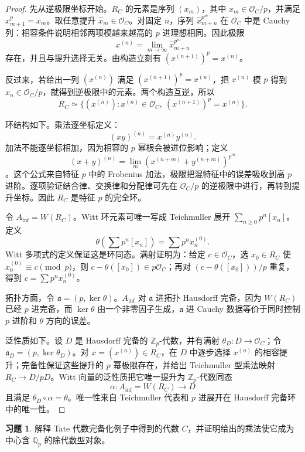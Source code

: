 \documentclass[11pt,a4paper,openany]{ctexbook}
\numberwithin{equation}{chapter}
\newcommand{\Q}{\mathbb{Q}}
\newcommand{\Z}{\mathbb{Z}}
\theoremstyle{plain}
\theoremstyle{definition}
\newtheorem{exercise}[theorem]{习题}
\theoremstyle{remark}
\begin{document}
\begin{proof}
先从逆极限坐标开始。$R_C$ 的元素是序列 $(x_m)$，其中 $x_m\in\mathcal O_C/p$，并满足 $x_{m+1}^p=x_m$。取任意提升 $\widehat x_m\in\mathcal O_C$。对固定 $n$，序列 $\widehat x_{m+n}^{p^m}$ 在 $\mathcal O_C$ 中是 Cauchy 列：相容条件说明相邻两项模越来越高的 $p$ 进理想相同。因此极限
\[
  x^{(n)}=\lim_{m\to\infty}\widehat x_{m+n}^{p^m}
\]
存在，并且与提升选择无关。由构造立刻有 $(x^{(n+1)})^p=x^{(n)}$。

反过来，若给出一列 $(x^{(n)})$ 满足 $(x^{(n+1)})^p=x^{(n)}$，把 $x^{(n)}$ 模 $p$ 得到 $x_n\in\mathcal O_C/p$，就得到逆极限中的元素。两个构造互逆，所以
\[
  R_C\simeq\{(x^{(n)}):x^{(n)}\in\mathcal O_C,\ (x^{(n+1)})^p=x^{(n)}\}.
\]

环结构如下。乘法逐坐标定义：
\[
  (xy)^{(n)}=x^{(n)}y^{(n)}.
\]
加法不能逐坐标相加，因为相容的 $p$ 幂根会被进位影响；定义
\[
  (x+y)^{(n)}=\lim_m(x^{(n+m)}+y^{(n+m)})^{p^m}
\]
。这个公式来自特征 $p$ 中的 Frobenius 加法，极限把混特征中的误差吸收到高 $p$ 进阶。逐项验证结合律、交换律和分配律可先在 $\mathcal O_C/p$ 的逆极限中进行，再转到提升坐标。因此 $R_C$ 是特征 $p$ 的完全环。

令 $A_{\inf}=W(R_C)$。Witt 环元素可唯一写成 Teichmuller 展开 $\sum_{n\ge0}p^n[x_n]$。定义
\[
  \theta\left(\sum p^n[x_n]\right)=\sum p^n x_n^{(0)}.
\]
Witt 多项式的定义保证这是环同态。满射证明为：给定 $c\in\mathcal O_C$，选 $x_0\in R_C$ 使 $x_0^{(0)}\equiv c\pmod p$，则 $c-\theta([x_0])\in p\mathcal O_C$；再对 $(c-\theta([x_0]))/p$ 重复，得到 $c=\sum p^n x_n^{(0)}$。

拓扑方面，令 $\mathfrak a=(p,\ker\theta)$。$A_{\inf}$ 对 $\mathfrak a$ 进拓扑 Hausdorff 完备，因为 $W(R_C)$ 已经 $p$ 进完备，而 $\ker\theta$ 由一个非零因子生成，$\mathfrak a$ 进 Cauchy 数据等价于同时控制 $p$ 进阶和 $\theta$ 方向的误差。

泛性质如下。设 $D$ 是 Hausdorff 完备的 $\Z_p$-代数，并有满射 $\theta_D:D\to\mathcal O_C$；令 $\mathfrak a_D=(p,\ker\theta_D)$。对 $x=(x^{(n)})\in R_C$，在 $D$ 中逐步选择 $x^{(n)}$ 的相容提升；完备性保证这些提升的 $p$ 幂极限存在，并给出 Teichmuller 型乘法映射 $R_C\to D/pD$。Witt 向量的泛性质把它唯一提升为 $\Z_p$-代数同态
\[
  \alpha:A_{\inf}=W(R_C)\to D
\]
且满足 $\theta_D\circ\alpha=\theta$。唯一性来自 Teichmuller 代表和 $p$ 进展开在 Hausdorff 完备环中的唯一性。
\end{proof}

\begin{exercise}
解释 Tate 代数完备化例子中得到的代数 $C$，并证明给出的乘法使它成为中心含 $\Q_p$ 的除代数型对象。
\end{exercise}
\end{document}

